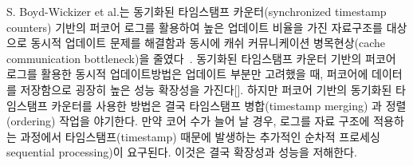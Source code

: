 S. Boyd-Wickizer et al.는 동기화된 타임스탬프 카운터(synchronized timestamp counters) 기반의
퍼코어 로그를 활용하여 높은 업데이트 비율을 가진 자료구조를 대상으로 동시적 업데이트 문제를
해결함과 동시에 캐쉬 커뮤니케이션 병목현상(cache communication bottleneck)을
줄였다~\cite{SilasBoydWickizerPth}.
동기화된 타임스탬프 카운터 기반의 퍼코어 로그를 활용한 동시적 업데이트방법은
업데이트 부분만 고려했을 때, 퍼코어에 데이터를 저장함으로 굉장히 높은 성능 확장성을
 가진다[].
하지만 퍼코어 기반의 동기화된 타임스탬프 카운터를 사용한 방법은 결국 타임스탬프 병합(timestamp merging)
과 정렬(ordering) 작업을 야기한다.
만약 코어 수가 늘어 날 경우, 로그를 자료 구조에 적용하는 과정에서 타임스탬프(timestamp)
 때문에 발생하는 추가적인 순차적 프로세싱sequential processing)이 요구된다.
이것은 결국 확장성과 성능을 저해한다. 


